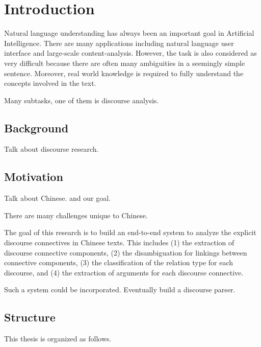 %
%
%
\chapter{Introduction}
\label{c:intro}

Natural language understanding has always been an important goal in Artificial Intelligence.
There are many applications including natural language user interface and large-scale content-analysis.
However, the task is also considered as very difficult because there are often many ambiguities in a seemingly
simple sentence. Moreover, real world knowledge is required to fully understand the concepts
involved in the text.

Many subtasks, one of them is discourse analysis.

%
%
\section{Background}

Talk about discourse research.




%
%
\section{Motivation}

Talk about Chinese. and our goal.

There are many challenges unique to Chinese.

The goal of this research is to build an end-to-end system to analyze the explicit discourse
connectives in Chinese texts. This includes (1) the extraction of discourse connective
components, (2) the disambiguation for linkings between connective components, (3) the classification
of the relation type for each discourse, and (4) the extraction of arguments for each discourse connective.

Such a system could be incorporated. Eventually build a discourse parser.

%
%
\section{Structure}
This thesis is organized as follows.
